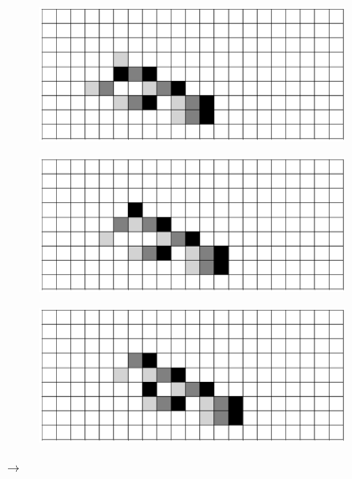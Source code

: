 \documentclass[12pt]{article}
\numberwithin{figure}{section} %
\begin{document}
\begin{figure}[H]
\begin{subfigure}{0.45\textwidth}
     	\subcaption{}
   	\end{subfigure}
    	\begin{subfigure}{0.45\textwidth}
     	\includegraphics[width=\linewidth]{Section4/35.3}
     	\subcaption{}
   	\end{subfigure}
	\newline
	\begin{subfigure}{0.45\textwidth}
     	\includegraphics[width=\linewidth]{Section4/35.4}
     	\subcaption{}
   	\end{subfigure}
    	\begin{subfigure}{0.45\textwidth}
     	\includegraphics[width=\linewidth]{Section4/35.5}
     	\subcaption{}
   	\end{subfigure}
	 {\LARGE$\rightarrow{}$}
	 \newline
	\begin{subfigure}{0.45\textwidth}

\end{subfigure}
\end{figure}
\end{document}
